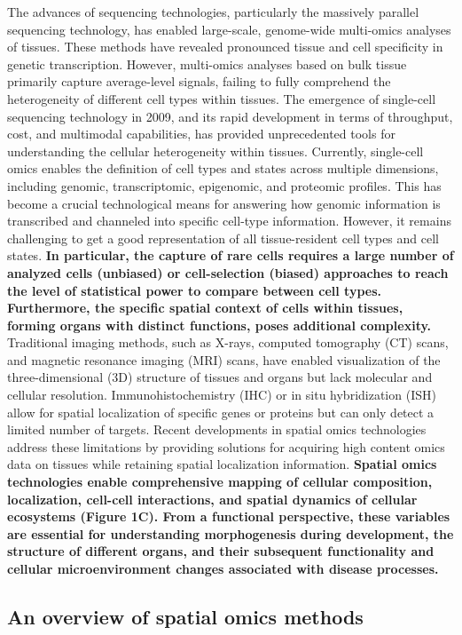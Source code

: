 \documentclass[
]{book}
\begin{document}
The advances of sequencing technologies, particularly the massively parallel sequencing technology, has enabled large-scale, genome-wide multi-omics analyses of tissues. These methods have revealed pronounced tissue and cell specificity in genetic transcription. However, multi-omics analyses based on bulk tissue primarily capture average-level signals, failing to fully comprehend the heterogeneity of different cell types within tissues. The emergence of single-cell sequencing technology in 2009, and its rapid development in terms of throughput, cost, and multimodal capabilities, has provided unprecedented tools for understanding the cellular heterogeneity within tissues. Currently, single-cell omics enables the definition of cell types and states across multiple dimensions, including genomic, transcriptomic, epigenomic, and proteomic profiles. This has become a crucial technological means for answering how genomic information is transcribed and channeled into specific cell-type information. However, it remains challenging to get a good representation of all tissue-resident cell types and cell states. \textbf{In particular, the capture of rare cells requires a large number of analyzed cells (unbiased) or cell-selection (biased) approaches to reach the level of statistical power to compare between cell types. Furthermore, the specific spatial context of cells within tissues, forming organs with distinct functions, poses additional complexity.} Traditional imaging methods, such as X-rays, computed tomography (CT) scans, and magnetic resonance imaging (MRI) scans, have enabled visualization of the three-dimensional (3D) structure of tissues and organs but lack molecular and cellular resolution. Immunohistochemistry (IHC) or in situ hybridization (ISH) allow for spatial localization of specific genes or proteins but can only detect a limited number of targets. Recent developments in spatial omics technologies address these limitations by providing solutions for acquiring high content omics data on tissues while retaining spatial localization information. \textbf{Spatial omics technologies enable comprehensive mapping of cellular composition, localization, cell-cell interactions, and spatial dynamics of cellular ecosystems (Figure 1C). From a functional perspective, these variables are essential for understanding morphogenesis during development, the structure of different organs, and their subsequent functionality and cellular microenvironment changes associated with disease processes.}

\hypertarget{an-overview-of-spatial-omics-methods}{%
\subsection{An overview of spatial omics methods}\label{an-overview-of-spatial-omics-methods}}
\end{document}
